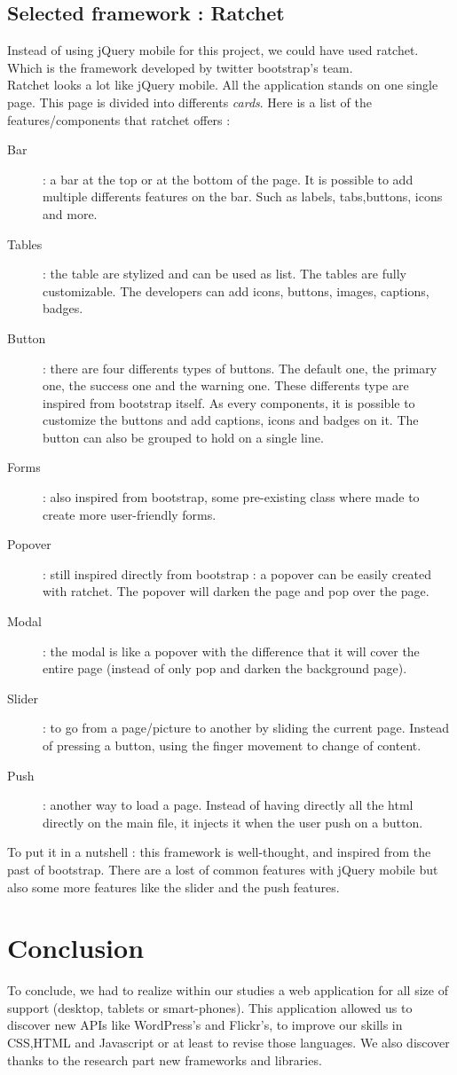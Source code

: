 \documentclass[12pt]{report}%
\begin{document}
\section{Selected framework : Ratchet}
Instead of using jQuery mobile for this project, we could have used ratchet. Which is the framework developed by twitter bootstrap's team.\\
Ratchet looks a lot like jQuery mobile. All the application stands on one single page. This page is divided into differents \textit{cards}.
Here is a list of the features/components that ratchet offers :
\begin{description}
	\item[Bar] : a bar at the top or at the bottom of the page. It is possible to add multiple differents features on the bar. Such as  labels, tabs,buttons, icons and more.
	\item[Tables] : the table are stylized and can be used as list. The tables are fully customizable. The developers can add icons, buttons, images, captions, badges.
	\item[Button] : there are four differents types of buttons. The default one, the primary one, the success one and the warning one. These differents type are inspired from bootstrap itself. As every components, it is possible to customize the buttons and add captions, icons and badges on it. The button can also be grouped to hold on a single line.
	\item[Forms] : also inspired from bootstrap, some pre-existing class where made to create more user-friendly forms.
	\item[Popover] : still inspired directly from bootstrap : a popover can be easily created with ratchet. The popover will darken the page and pop over the page.
	\item[Modal] : the modal is like a popover with the difference that it will cover the entire page (instead of only pop and darken the background page).
	\item[Slider] : to go from a page/picture to another by sliding the current page. Instead of pressing a button, using the finger movement to change of content.
	\item[Push] : another way to load a page. Instead of having directly all the html directly on the main file, it injects it when the user push on a button.
\end{description}
To put it in a nutshell : this framework is well-thought, and inspired from the past of bootstrap. There are a lost of common features with jQuery mobile but also some more features like the slider and the push features.

\chapter{Conclusion}
To conclude, we had to realize within our studies a web application for all size of support (desktop, tablets or smart-phones). This application allowed us to discover new APIs like WordPress's and Flickr's, to improve our skills in CSS,HTML and Javascript or at least to revise those languages. We also discover thanks to the research part new frameworks and libraries.
\clearpage
\end{document}

